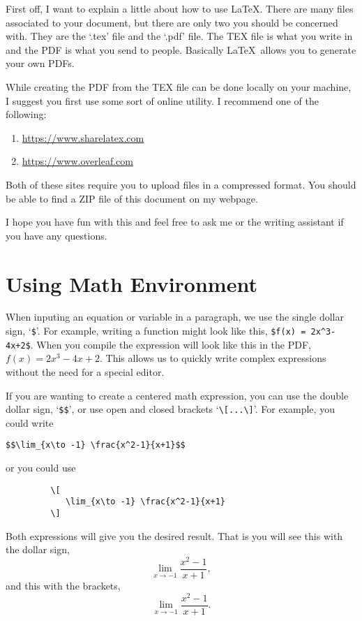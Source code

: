 \documentclass{amsart}
\begin{document}
   First off, I want to explain a little about how to use \LaTeX. There are many files associated to your document, but there are only two you should be concerned with. They are the `.tex' file and the `.pdf' file. The TEX file is what you write in and the PDF is what you send to people.  Basically \LaTeX\ allows you to generate your own PDFs. 

   While creating the PDF from the TEX file can be done locally on your machine, I suggest you first use some sort of online utility. I recommend one of the following:
   \begin{enumerate}
      \item \url{https://www.sharelatex.com}
      \item \url{https://www.overleaf.com}
   \end{enumerate}
   Both of these sites require you to upload files in a compressed format. You should be able to find a ZIP file of this document on my webpage.  

   I hope you have fun with this and feel free to ask me or the writing assistant if you have any questions.



\section{Using Math Environment} \label{math} 


   When inputing an equation or variable in a paragraph, we use the single dollar sign, `\verb|$|'. For example, writing a function might look like this, \verb|$f(x) = 2x^3-4x+2$|. When you compile the expression will look like this in the PDF, $f(x) = 2x^3-4x+2$. This allows us to quickly write complex expressions without the need for a special editor.

   If you are wanting to create a centered math expression, you can use the double dollar sign, `\verb|$$|', or use open and closed brackets `\verb|\[...\]|'. For example, you could write
      \begin{center}
         \verb|$$\lim_{x\to -1} \frac{x^2-1}{x+1}$$|
      \end{center}
   or you could use
      \begin{center} 
         \begin{verbatim}
         \[
            \lim_{x\to -1} \frac{x^2-1}{x+1}
         \]         
         \end{verbatim}
      \end{center}
   Both expressions will give you the desired result.  That is you will see this with the dollar sign, 
   $$\lim_{x\to -1} \frac{x^2-1}{x+1},$$
   and this with the brackets,
      \[
          \lim_{x\to -1} \frac{x^2-1}{x+1}.
      \]     
\end{document}
